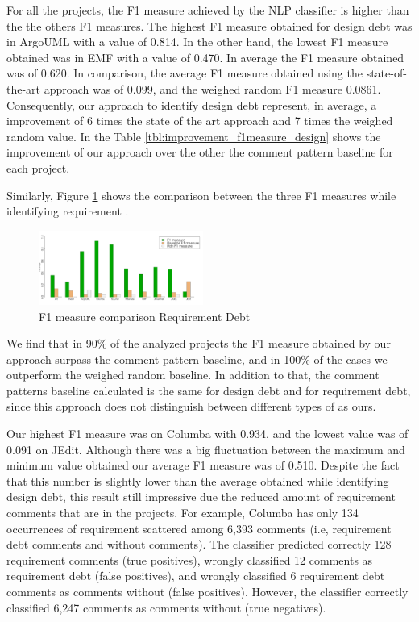 For all the projects, the F1 measure achieved by the NLP classifier is higher than the the others F1 measures. The highest F1 measure obtained for design debt was in ArgoUML with a value of 0.814. In the other hand, the lowest F1 measure obtained was in EMF with a value of 0.470. In average the F1 measure obtained was of 0.620. In comparison, the average F1 measure obtained using the state-of-the-art approach was of 0.099, and the weighed random F1 measure 0.0861. Consequently, our approach to identify design debt represent, in average, a improvement of 6 times the state of the art approach and 7 times the weighed random value. In the  Table \ref{tbl:improvement_f1measure_design} shows the improvement of our approach over the other the comment pattern baseline for each project. 
 
Similarly, Figure \ref{fig:f1_measure_comparison_requeriment} shows the comparison between the three F1 measures while identifying requirement \SATD.

\begin{figure}[thb!]
  \centering
  \includegraphics[width=0.48\textwidth]{figures/f1_measure_comparison_requirement_2.pdf}
  \vspace{-3mm}
  \caption{F1 measure comparison Requirement Debt}
  \label{fig:f1_measure_comparison_requeriment}
\end{figure}

We find that in 90\% of the analyzed projects the F1 measure obtained by our approach surpass the comment pattern baseline, and in 100\% of the cases we outperform the weighed random baseline. In addition to that, the comment patterns baseline calculated is the same for design debt and for requirement debt, since this approach does not distinguish between different types of \SATD as ours. 

Our highest F1 measure was on Columba with 0.934, and the lowest value was of 0.091 on JEdit. Although there was a big fluctuation between the maximum and minimum value obtained our average F1 measure was of 0.510. Despite the fact that this number is slightly lower than the average obtained while  identifying design debt, this result still impressive due the reduced amount of requirement \SATD comments that are in the projects. For example, Columba has only 134 occurrences of requirement \SATD scattered among 6,393 comments (i.e, requirement debt comments and without \SATD comments). The classifier predicted correctly 128 requirement \SATD comments (true positives), wrongly classified 12 comments as requirement debt (false positives), and wrongly classified 6 requirement debt comments as comments without \SATD (false positives). However, the classifier correctly classified 6,247 comments as comments without \SATD (true negatives).

